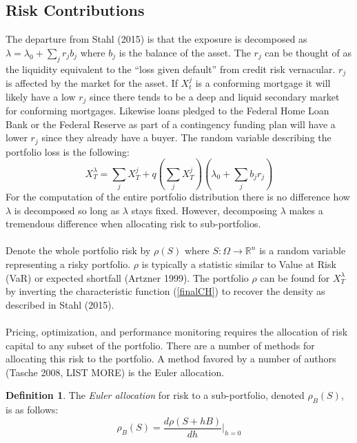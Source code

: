 \documentclass[12pt]{article}
\theoremstyle{definition}
\newtheorem{riskmeasure}{Definition}
\begin{document}
\subsection{Risk Contributions}

The departure from Stahl (2015) is that the exposure is decomposed as \(\lambda=\lambda_0+\sum_j r_j b_j\) where \(b_j\) is the balance of the asset.  The \(r_j\) can be thought of as the liquidity equivalent to the ``loss given default'' from credit risk vernacular.  \(r_j\) is affected by the market for the asset.  If \(X_t ^ j\) is a conforming mortgage it will likely have a low \(r_j\) since there tends to be a deep and liquid secondary market for conforming mortgages.  Likewise loans pledged to the Federal Home Loan Bank or the Federal Reserve as part of a contingency funding plan will have a lower \(r_j\) since they already have a buyer.  The random variable describing the portfolio loss is the following:
\begin{equation}X_T ^ \lambda=\sum_j X_T ^ j+q\left(\sum_j X_T ^ j\right)\left(\lambda_0+\sum_j b_j r_j\right)\end{equation}
For the computation of the entire portfolio distribution there is no difference how \(\lambda\) is decomposed so long as \(\lambda\) stays fixed.  However, decomposing \(\lambda\) makes a tremendous difference when allocating risk to sub-portfolios.  
\\
\\
Denote the whole portfolio risk by \(\rho(S)\) where \(S: \Omega \to \mathbb{R} ^ n \) is a random variable representing a risky portfolio.  \(\rho\) is typically a statistic similar to Value at Risk (VaR) or expected shortfall (Artzner 1999).  The portfolio \(\rho\) can be found for \(X_T ^ \lambda\) by inverting the characteristic function (\ref{finalCH}) to recover the density as described in Stahl (2015). 
\\
\\
 Pricing, optimization, and performance monitoring requires the allocation of risk capital to any subset of the portfolio.  There are a number of methods for allocating this risk to the portfolio.  A method favored by a number of authors (Tasche 2008, LIST MORE) is the Euler allocation.  

\begin{riskmeasure}
The \emph{Euler allocation} for risk to a sub-portfolio, denoted \(\rho_B(S)\), is as follows:
 \[ \rho_B(S)=\frac{d\rho(S+hB)}{dh} \bigg|_{h=0}\]
\end{riskmeasure}
\end{document}
